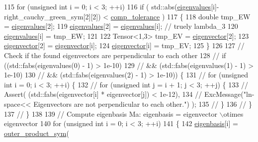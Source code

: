 \begin{DoxyCode}
115             \textcolor{keywordflow}{for} (\textcolor{keywordtype}{unsigned} \textcolor{keywordtype}{int} i = 0; i < 3; ++i)
116                  \textcolor{keywordflow}{if} ( std::abs(\hyperlink{classln__space_aad33c1f308694e2801bbea7730d3b9c6}{eigenvalues}[i]-right\_cauchy\_green\_sym[2][2]) < 
      \hyperlink{classln__space_adb90c475844ad73f0ff8b40e80900180}{comp\_tolerance} )
117                  \{
118                      \textcolor{keywordtype}{double} tmp\_EW = \hyperlink{classln__space_aad33c1f308694e2801bbea7730d3b9c6}{eigenvalues}[2];
119                      \hyperlink{classln__space_aad33c1f308694e2801bbea7730d3b9c6}{eigenvalues}[2] = \hyperlink{classln__space_aad33c1f308694e2801bbea7730d3b9c6}{eigenvalues}[i]; \textcolor{comment}{// truely lambda\_3}
120                      \hyperlink{classln__space_aad33c1f308694e2801bbea7730d3b9c6}{eigenvalues}[i] = tmp\_EW;
121 
122                      Tensor<1,3> tmp\_EV = \hyperlink{classln__space_ada3f56f8a97f974275c267ac172a0b40}{eigenvector}[2];
123                      \hyperlink{classln__space_ada3f56f8a97f974275c267ac172a0b40}{eigenvector}[2] = \hyperlink{classln__space_ada3f56f8a97f974275c267ac172a0b40}{eigenvector}[i];
124                      \hyperlink{classln__space_ada3f56f8a97f974275c267ac172a0b40}{eigenvector}[i] = tmp\_EV;
125                  \}
126 
127         \textcolor{comment}{// Check if the found eigenvectors are perpendicular to each other}
128 \textcolor{comment}{//      if ((std::fabs(eigenvalues(0) - 1) > 1e-10)}
129 \textcolor{comment}{//          && (std::fabs(eigenvalues(1) - 1) > 1e-10)}
130 \textcolor{comment}{//          && (std::fabs(eigenvalues(2) - 1) > 1e-10)) \{}
131 \textcolor{comment}{//          for (unsigned int i = 0; i < 3; ++i) \{}
132 \textcolor{comment}{//              for (unsigned int j = i + 1; j < 3; ++j) \{}
133 \textcolor{comment}{//                  Assert( (std::fabs(eigenvector[i] * eigenvector[j]) < 1e-12),}
134 \textcolor{comment}{//                               ExcMessage("ln-space<< Eigenvectors are not perpendicular to each other.")
       );}
135 \textcolor{comment}{//              \}}
136 \textcolor{comment}{//          \}}
137 \textcolor{comment}{//      \}}
138 
139         \textcolor{comment}{// Compute eigenbasis Ma: eigenbasis = eigenvector \(\backslash\)otimes eigenvector}
140          \textcolor{keywordflow}{for} (\textcolor{keywordtype}{unsigned} \textcolor{keywordtype}{int} i = 0; i < 3; ++i)
141          \{
142             \hyperlink{classln__space_a1e67221edabbd2db69aa4a21262bd1f4}{eigenbasis}[i] = \hyperlink{functions_8h_aa5f33021df9244e49e86b17b15286fa1}{outer\_product\_sym}(

\end{DoxyCode}
